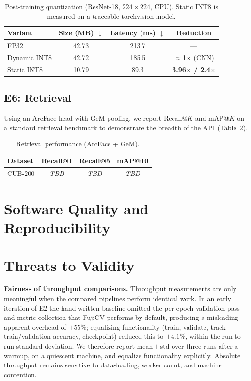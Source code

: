 \documentclass[11pt]{article}
\begin{document}
\begin{table}[h]
\centering
\caption{Post-training quantization (ResNet-18, $224{\times}224$, CPU). Static
INT8 is measured on a traceable torchvision model.}
\label{tab:deploy}
\small
\begin{tabular}{lccc}
\toprule
Variant & Size (MB) $\downarrow$ & Latency (ms) $\downarrow$ & Reduction \\
\midrule
FP32          & 42.73 & 213.7 & --- \\
Dynamic INT8  & 42.72 & 185.5 & $\approx$1$\times$ (CNN) \\
Static INT8   & 10.79 & 89.3  & \textbf{3.96$\times$ / 2.4$\times$} \\
\bottomrule
\end{tabular}
\end{table}

\subsection{E6: Retrieval}
\label{sec:e6}
Using an ArcFace head with GeM pooling, we report Recall@$K$ and mAP@$K$ on a
standard retrieval benchmark to demonstrate the breadth of the API
(Table~\ref{tab:retrieval}).

\begin{table}[h]
\centering
\caption{Retrieval performance (ArcFace + GeM).}
\label{tab:retrieval}
\small
\begin{tabular}{lccc}
\toprule
Dataset & Recall@1 & Recall@5 & mAP@10 \\
\midrule
CUB-200 & \textit{TBD} & \textit{TBD} & \textit{TBD} \\
\bottomrule
\end{tabular}
\end{table}

\section{Software Quality and Reproducibility}
\label{sec:quality}

\section{Threats to Validity}
\label{sec:threats}
\textbf{Fairness of throughput comparisons.} Throughput measurements are only
meaningful when the compared pipelines perform identical work. In an early
iteration of E2 the hand-written baseline omitted the per-epoch validation pass
and metric collection that FujiCV performs by default, producing a misleading
apparent overhead of $+55\%$; equalizing functionality (train, validate, track
train/validation accuracy, checkpoint) reduced this to $+4.1\%$, within the
run-to-run standard deviation. We therefore report mean\,$\pm$\,std over three
runs after a warmup, on a quiescent machine, and equalize functionality
explicitly. Absolute throughput remains sensitive to data-loading, worker count,
and machine contention.
\end{document}
